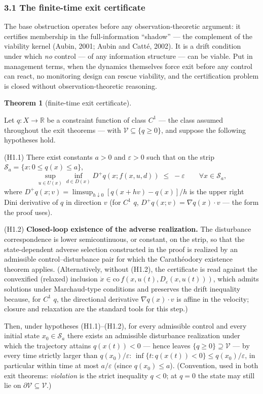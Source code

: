 \documentclass[10pt,twocolumn]{article}
\theoremstyle{definition}
\newtheorem{theorem}{Theorem}
\begin{document}
\subsubsection{3.1 The finite-time exit
certificate}\label{the-finite-time-exit-certificate}

The base obstruction operates before any observation-theoretic argument: it
certifies membership in the full-information ``shadow'' --- the
complement of the viability kernel (Aubin, 2001; Aubin and
Catt\'e, 2002).
It is a drift condition under which \emph{no} control --- of any
information structure --- can be viable. Put in management terms, when the dynamics themselves force exit before any control can react, no monitoring design can rescue viability, and the certification problem is closed without observation-theoretic reasoning.

\begin{theorem}[finite-time exit certificate]\label{thm:exit}

Let \(q : X \to \mathbb{R}\) be a constraint function of class \(C^1\) --- the class assumed throughout the exit theorems --- with
\(\mathcal{V} \subseteq \{ q \ge 0 \}\), and suppose the following
hypotheses hold.

(H1.1) There exist constants \(a > 0\) and \(\varepsilon > 0\) such that
on the strip \(\mathcal{S}_a = \{ x : 0 \le q(x) \le a \}\),
\[\sup_{u \in U(x)} \inf_{d \in D(x)} D^+ q(x; f(x,u,d)) \;\le\; -\varepsilon \qquad \forall x \in \mathcal{S}_a, \tag{1}\]
where \(D^+ q(x; v) = \limsup_{h \downarrow 0} [q(x + hv) - q(x)]/h\) is
the upper right Dini derivative of \(q\) in direction \(v\) (for \(C^1\)
\(q\), \(D^+ q(x; v) = \nabla q(x) \cdot v\) --- the form the proof
uses).

(H1.2) \textbf{Closed-loop existence of the adverse realization.} The
disturbance correspondence is lower semicontinuous, or constant, on the
strip, so that the state-dependent adverse selection constructed in the
proof is realized by an admissible control--disturbance pair for which
the Carath\'eodory existence theorem applies. (Alternatively, without (H1.2), the certificate is read against the convexified (relaxed) inclusion
\(\dot x \in \mathrm{co}\, f(x, u(t), D_{\varepsilon}(x, u(t)))\), which
admits solutions under Marchaud-type conditions and preserves the drift
inequality because, for \(C^1\) \(q\), the directional derivative
\(\nabla q(x)\cdot v\) is affine in the velocity; closure and
relaxation are the standard tools for this step.)

Then, under hypotheses (H1.1)--(H1.2), for every
admissible control and every initial state \(x_0 \in \mathcal{S}_a\)
there exists an admissible disturbance realization under which the
trajectory attains \(q(x(t)) < 0\) --- hence leaves
\(\{ q \ge 0 \} \supseteq \mathcal{V}\) --- by every time strictly
larger than \(q(x_0)/\varepsilon\):
\(\inf\{ t : q(x(t)) < 0 \} \le q(x_0)/\varepsilon\), in particular
within time at most \(a/\varepsilon\) (since \(q(x_0) \le a\)).
(Convention, used in both exit theorems: \emph{violation} is the strict
inequality \(q < 0\); at \(q = 0\) the state may still lie on
\(\partial \mathcal{V} \subseteq \mathcal{V}\).)

\end{theorem}
\end{document}
